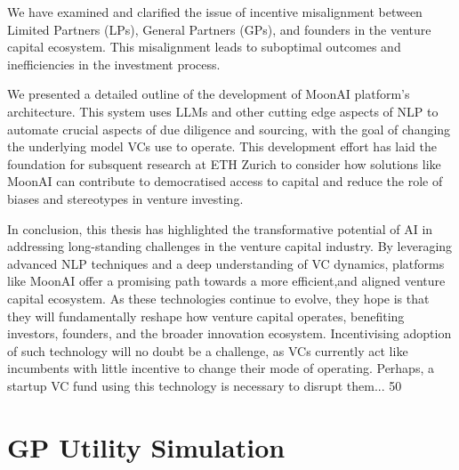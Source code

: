 \documentclass[a4paper, oneside]{discothesis}
\begin{document}
We have examined and clarified the issue of incentive misalignment between Limited Partners (LPs), General Partners (GPs), and founders in the venture capital ecosystem. This misalignment leads to suboptimal outcomes and inefficiencies in the investment process. 

We presented a detailed outline of the development of MoonAI platform's architecture. This system uses LLMs and other cutting edge aspects of NLP to automate crucial aspects of due diligence and sourcing, with the goal of changing the underlying model VCs use to operate. This development effort has laid the foundation for subsquent research at ETH Zurich to consider how solutions like MoonAI can contribute to democratised access to capital and reduce the role of biases and stereotypes in venture investing. 

In conclusion, this thesis has highlighted the transformative potential of AI in
addressing long-standing challenges in the venture capital industry. By leveraging
advanced NLP techniques and a deep understanding of VC dynamics, platforms
like MoonAI offer a promising path towards a more efficient,and aligned venture
capital ecosystem. As these technologies continue to evolve, they hope is that they
will fundamentally reshape how venture capital operates, benefiting investors,
founders, and the broader innovation ecosystem. Incentivising adoption of such
technology will no doubt be a challenge, as VCs currently act like incumbents
with little incentive to change their mode of operating. Perhaps, a startup VC
fund using this technology is necessary to disrupt them...
50





\appendix
\chapter{GP Utility Simulation}
\end{document}
